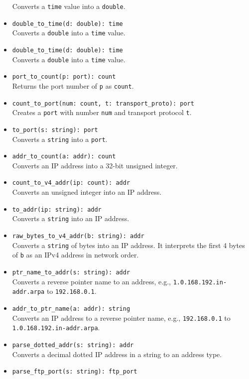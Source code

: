 \documentclass[10pt,landscape]{article}
\begin{document}
\begin{multicols*}{2}
\begin{itemize}
    Converts a \texttt{time} value into a \texttt{double}.
  \item \verb|double_to_time(d: double): time|\\
    Converts a \texttt{double} into a \texttt{time} value.
  \item \verb|double_to_time(d: double): time|\\
    Converts a \texttt{double} into a \texttt{time} value.
  \item \verb|port_to_count(p: port): count|\\
    Returns the port number of \texttt{p} as \texttt{count}.
  \item \verb|count_to_port(num: count, t: transport_proto): port|\\
    Creates a \texttt{port} with number \texttt{num} and transport protocol
    \texttt{t}.
  \item \verb|to_port(s: string): port|\\
    Converts a \texttt{string} into a \texttt{port}.
  \item \verb|addr_to_count(a: addr): count|\\
    Converts an IP address into a 32-bit unsigned integer.
  \item \verb|count_to_v4_addr(ip: count): addr|\\
    Converts an unsigned integer into an IP address.
  \item \verb|to_addr(ip: string): addr|\\
    Converts a \texttt{string} into an IP address.
  \item \verb|raw_bytes_to_v4_addr(b: string): addr|\\
    Converts a \texttt{string} of bytes into an IP address. It interprets the
    first 4 bytes of \texttt{b} as an IPv4 address in network order.
  \item \verb|ptr_name_to_addr(s: string): addr|\\
    Converts a reverse pointer name to an address, e.g.,
    \verb|1.0.168.192.in-addr.arpa| to \verb|192.168.0.1|.
  \item \verb|addr_to_ptr_name(a: addr): string|\\
    Converts an IP address to a reverse pointer name, e.g.,
    \verb|192.168.0.1| to \verb|1.0.168.192.in-addr.arpa|.
  \item \verb|parse_dotted_addr(s: string): addr|\\
    Converts a decimal dotted IP address in a string to an address type.
  \item \verb|parse_ftp_port(s: string): ftp_port|\\

\end{itemize}
\end{multicols*}
\end{document}
